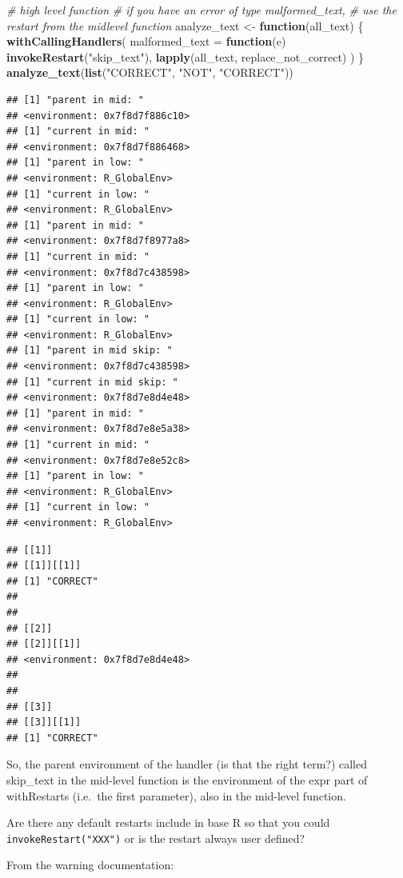 \documentclass[]{book}
\newenvironment{Shaded}{\begin{snugshade}}{\end{snugshade}}
\newcommand{\CommentTok}[1]{\textcolor[rgb]{0.56,0.35,0.01}{\textit{#1}}}
\newcommand{\ControlFlowTok}[1]{\textcolor[rgb]{0.13,0.29,0.53}{\textbf{#1}}}
\newcommand{\DataTypeTok}[1]{\textcolor[rgb]{0.13,0.29,0.53}{#1}}
\newcommand{\KeywordTok}[1]{\textcolor[rgb]{0.13,0.29,0.53}{\textbf{#1}}}
\newcommand{\NormalTok}[1]{#1}
\newcommand{\StringTok}[1]{\textcolor[rgb]{0.31,0.60,0.02}{#1}}
\begin{document}
\begin{Shaded}
\begin{Highlighting}[]
\CommentTok{# high level function}
\CommentTok{# if you have an error of type malformed_text, }
\CommentTok{# use the restart from the midlevel function}
\NormalTok{analyze_text <-}\StringTok{ }\ControlFlowTok{function}\NormalTok{(all_text) \{}
  \KeywordTok{withCallingHandlers}\NormalTok{(}
    \DataTypeTok{malformed_text =} \ControlFlowTok{function}\NormalTok{(e) }\KeywordTok{invokeRestart}\NormalTok{(}\StringTok{"skip_text"}\NormalTok{),}
    \KeywordTok{lapply}\NormalTok{(all_text, replace_not_correct)}
\NormalTok{  )}
\NormalTok{\}}
\KeywordTok{analyze_text}\NormalTok{(}\KeywordTok{list}\NormalTok{(}\StringTok{"CORRECT"}\NormalTok{, }\StringTok{"NOT"}\NormalTok{, }\StringTok{"CORRECT"}\NormalTok{))}
\end{Highlighting}
\end{Shaded}

\begin{verbatim}
## [1] "parent in mid: "
## <environment: 0x7f8d7f886c10>
## [1] "current in mid: "
## <environment: 0x7f8d7f886468>
## [1] "parent in low: "
## <environment: R_GlobalEnv>
## [1] "current in low: "
## <environment: R_GlobalEnv>
## [1] "parent in mid: "
## <environment: 0x7f8d7f8977a8>
## [1] "current in mid: "
## <environment: 0x7f8d7c438598>
## [1] "parent in low: "
## <environment: R_GlobalEnv>
## [1] "current in low: "
## <environment: R_GlobalEnv>
## [1] "parent in mid skip: "
## <environment: 0x7f8d7c438598>
## [1] "current in mid skip: "
## <environment: 0x7f8d7e8d4e48>
## [1] "parent in mid: "
## <environment: 0x7f8d7e8e5a38>
## [1] "current in mid: "
## <environment: 0x7f8d7e8e52c8>
## [1] "parent in low: "
## <environment: R_GlobalEnv>
## [1] "current in low: "
## <environment: R_GlobalEnv>
\end{verbatim}

\begin{verbatim}
## [[1]]
## [[1]][[1]]
## [1] "CORRECT"
## 
## 
## [[2]]
## [[2]][[1]]
## <environment: 0x7f8d7e8d4e48>
## 
## 
## [[3]]
## [[3]][[1]]
## [1] "CORRECT"
\end{verbatim}

So, the parent environment of the handler (is that the right term?) called skip\_text in the mid-level function is the environment of the expr part of withRestarts (i.e.~the first parameter), also in the mid-level function.

Are there any default restarts include in base R so that you could \texttt{invokeRestart("XXX")} or is the restart always user defined?

From the warning documentation:
\end{document}
